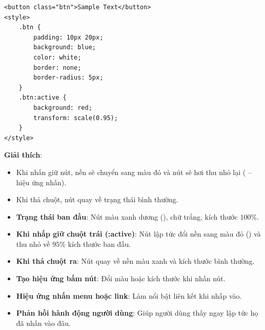 \begin{conceptBox}
\begin{codeWindow}
\begin{lstlisting}[language=HTML5]
<button class="btn">Sample Text</button>
<style>
    .btn {
        padding: 10px 20px;
        background: blue;
        color: white;
        border: none;
        border-radius: 5px;
    }
    .btn:active {
        background: red;
        transform: scale(0.95);
    }
</style>
\end{lstlisting}
\end{codeWindow}
\textbf{Giải thích}:
\begin{itemize}[leftmargin=1.5em, itemsep=2pt, parsep=0pt]
    \item Khi nhấn giữ nút, nền sẽ chuyển sang màu đỏ và nút sẽ hơi thu nhỏ lại ( -- hiệu ứng nhấn).
    \item Khi thả chuột, nút quay về trạng thái bình thường.
\end{itemize}
\end{conceptBox}

\begin{browserWindow}
\begin{itemize}[leftmargin=1.5em, itemsep=3pt, parsep=0pt]
    \item \textbf{Trạng thái ban đầu}: Nút màu xanh dương (), chữ trắng, kích thước $100\%$.
    \item \textbf{Khi nhấp giữ chuột trái (:active)}: Nút lập tức đổi nền sang màu đỏ () và thu nhỏ về $95\%$ kích thước ban đầu.
    \item \textbf{Khi thả chuột ra}: Nút quay về nền màu xanh và kích thước bình thường.
\end{itemize}
\end{browserWindow}

\begin{tipBox}
\begin{itemize}[leftmargin=1.5em, itemsep=3pt, parsep=0pt]
    \item \textbf{Tạo hiệu ứng bấm nút}: Đổi màu hoặc kích thước khi nhấn nút.
    \item \textbf{Hiệu ứng nhấn menu hoặc link}: Làm nổi bật liên kết khi nhấp vào.
    \item \textbf{Phản hồi hành động người dùng}: Giúp người dùng thấy ngay lập tức họ đã nhấn vào đâu.
\end{itemize}
\end{tipBox}

